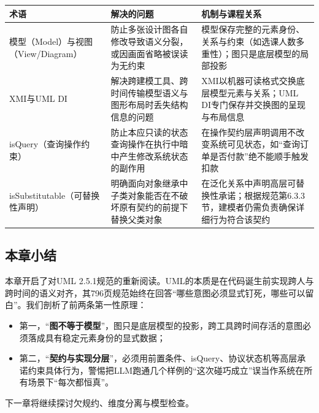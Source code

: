 \documentclass[UTF8,a4paper,11pt,fontset=fandol]{ctexart}
\begin{document}
\begin{center}\small\begin{tabularx}{\linewidth}{YYY}

\toprule

术语 & 解决的问题 & 机制与课程关系\\\midrule

模型（Model）与视图（View/Diagram） & 防止多张设计图各自修改导致语义分裂，或因画面省略被误读为无约束 & 模型保存完整的元素身份、关系与约束（如选课人数多重性）；图只是底层模型的局部投影\\[3pt]

XMI与UML DI & 解决跨建模工具、跨时间传输模型语义与图形布局时丢失结构信息的问题 & XMI以机器可读格式交换底层模型元素与关系；UML DI专门保存并交换图的呈现与布局信息\\[3pt]

isQuery（查询操作约束） & 防止本应只读的状态查询操作在执行中暗中产生修改系统状态的副作用 & 在操作契约层声明调用不改变系统可见状态，如“查询订单是否付款”绝不能顺手触发扣款\\[3pt]

isSubstitutable（可替换性声明） & 明确面向对象继承中子类对象能否在不破坏原有契约的前提下替换父类对象 & 在泛化关系中声明高层可替换性承诺；根据规范第6.3.3节，建模者仍需负责确保详细行为符合该契约\\[3pt]

\bottomrule\end{tabularx}\end{center}

\subsection{本章小结}

本章开启了对UML 2.5.1规范的重新阅读。UML的本质是在代码诞生前实现跨人与跨时间的语义对齐，其796页规范始终在回答“哪些意图必须显式钉死，哪些可以留白”。我们剖析了前两条第一性原理：

\begin{itemize}
\item 第一，“\textbf{图不等于模型}”，图只是底层模型的投影，跨工具跨时间存活的意图必须落成具有稳定元素身份的显式数据；

\item 第二，“\textbf{契约与实现分层}”，必须用前置条件、isQuery、协议状态机等高层承诺约束具体行为，警惕把LLM跑通几个样例的“这次碰巧成立”误当作系统在所有场景下“每次都恒真”。

\end{itemize}
下一章将继续探讨欠规约、维度分离与模型检查。
\end{document}
